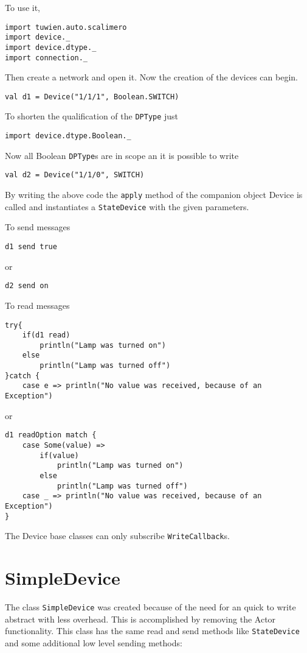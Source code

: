 To use it,
\begin{lstlisting}
import tuwien.auto.scalimero
import device._
import device.dtype._
import connection._
\end{lstlisting}
Then create a network and open it. Now the creation of the devices can begin.
\begin{lstlisting}
val d1 = Device("1/1/1", Boolean.SWITCH)
\end{lstlisting}
To shorten the qualification of the \lstinline!DPType! just
\begin{lstlisting}
import device.dtype.Boolean._
\end{lstlisting}
 Now all Boolean \lstinline!DPType!s are in scope an it is possible to write
\begin{lstlisting}
val d2 = Device("1/1/0", SWITCH)
\end{lstlisting}
By writing the above code the \lstinline!apply! method of the companion object Device is called and instantiates a \lstinline!StateDevice! with the given parameters.

To send messages
\begin{lstlisting}
d1 send true
\end{lstlisting}
or
\begin{lstlisting}
d2 send on
\end{lstlisting}
To read messages
\begin{lstlisting}
try{
    if(d1 read)
        println("Lamp was turned on")
    else
        println("Lamp was turned off")
}catch {
    case e => println("No value was received, because of an Exception")
\end{lstlisting}
or
\begin{lstlisting}
d1 readOption match {
    case Some(value) =>
        if(value)
            println("Lamp was turned on")
        else
            println("Lamp was turned off")
    case _ => println("No value was received, because of an Exception")
}
\end{lstlisting}
The Device base classes can only subscribe \lstinline!WriteCallback!s.
\section{SimpleDevice}

The class \lstinline!SimpleDevice! was created because of the need for an quick to write abstract with less overhead. This is accomplished by removing the Actor functionality. This class has the same read and send methods like \lstinline!StateDevice! and some additional low level sending methods:


